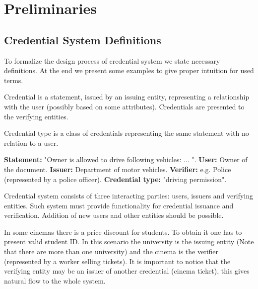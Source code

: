 \chapter{Preliminaries}
\thispagestyle{chapterBeginStyle}


\section{Credential System Definitions}
To formalize the design process of credential system we state necessary definitions. At the end we present some examples to give proper intuition for used terms. 

\begin{definition}[Credential]
Credential is a statement, issued by an issuing entity, representing a relationship with the user (possibly based on some attributes). Credentials are presented to the verifying entities.
\end{definition}

\begin{definition}
Credential type is a class of credentials representing the same statement with no relation to a user.
\end{definition}

\begin{example}
\textbf{Statement:} "Owner is allowed to drive following vehicles: ... ".
\textbf{User:} Owner of the document. 
\textbf{Issuer:} Department of motor vehicles.
\textbf{Verifier:} e.g. Police (represented by a police officer). 
\textbf{Credential type:} "driving permission".
\end{example}

\begin{definition}
Credential system consists of three interacting parties: users, issuers and verifying entities. Such system must provide functionality for credential issuance and verification. Addition of new users and other entities should be possible.
\end{definition}

\begin{example}
In some cinemas there is a price discount for students. To obtain it one has to present valid student ID. In this scenario the university is the issuing entity (Note that there are more than one university) and the cinema is the verifier (represented by a worker selling tickets). It is important to notice that the verifying entity may be an issuer of another credential (cinema ticket), this gives natural flow to the whole system.
\end{example}

